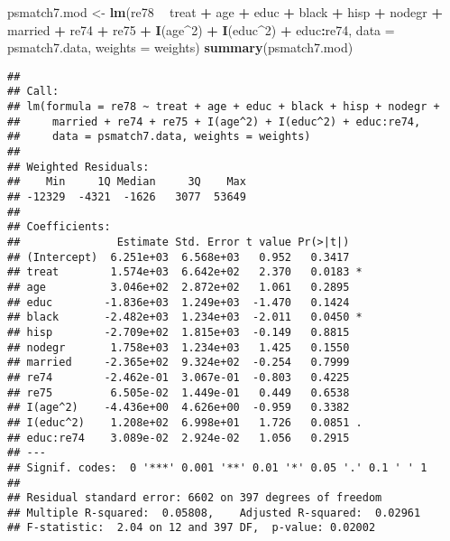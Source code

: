 \documentclass[]{article}
\newenvironment{Shaded}{\begin{snugshade}}{\end{snugshade}}
\newcommand{\DataTypeTok}[1]{\textcolor[rgb]{0.13,0.29,0.53}{#1}}
\newcommand{\DecValTok}[1]{\textcolor[rgb]{0.00,0.00,0.81}{#1}}
\newcommand{\KeywordTok}[1]{\textcolor[rgb]{0.13,0.29,0.53}{\textbf{#1}}}
\newcommand{\NormalTok}[1]{#1}
\newcommand{\OperatorTok}[1]{\textcolor[rgb]{0.81,0.36,0.00}{\textbf{#1}}}
\newcommand{\StringTok}[1]{\textcolor[rgb]{0.31,0.60,0.02}{#1}}
\begin{document}
\begin{Shaded}
\begin{Highlighting}[]
\NormalTok{psmatch7.mod <-}\StringTok{ }\KeywordTok{lm}\NormalTok{(re78 }\OperatorTok{~}\StringTok{ }\NormalTok{treat }\OperatorTok{+}\StringTok{ }\NormalTok{age }\OperatorTok{+}\StringTok{ }\NormalTok{educ }\OperatorTok{+}\StringTok{ }\NormalTok{black }\OperatorTok{+}\StringTok{ }\NormalTok{hisp }\OperatorTok{+}\StringTok{ }\NormalTok{nodegr }\OperatorTok{+}\StringTok{ }\NormalTok{married }\OperatorTok{+}\StringTok{ }\NormalTok{re74 }\OperatorTok{+}\StringTok{ }\NormalTok{re75 }\OperatorTok{+}\StringTok{ }
\StringTok{                     }\KeywordTok{I}\NormalTok{(age}\OperatorTok{^}\DecValTok{2}\NormalTok{) }\OperatorTok{+}\StringTok{ }\KeywordTok{I}\NormalTok{(educ}\OperatorTok{^}\DecValTok{2}\NormalTok{) }\OperatorTok{+}\StringTok{ }\NormalTok{educ}\OperatorTok{:}\NormalTok{re74, }
                   \DataTypeTok{data =}\NormalTok{ psmatch7.data, }\DataTypeTok{weights =}\NormalTok{ weights)}
\KeywordTok{summary}\NormalTok{(psmatch7.mod)}
\end{Highlighting}
\end{Shaded}

\begin{verbatim}
## 
## Call:
## lm(formula = re78 ~ treat + age + educ + black + hisp + nodegr + 
##     married + re74 + re75 + I(age^2) + I(educ^2) + educ:re74, 
##     data = psmatch7.data, weights = weights)
## 
## Weighted Residuals:
##    Min     1Q Median     3Q    Max 
## -12329  -4321  -1626   3077  53649 
## 
## Coefficients:
##               Estimate Std. Error t value Pr(>|t|)  
## (Intercept)  6.251e+03  6.568e+03   0.952   0.3417  
## treat        1.574e+03  6.642e+02   2.370   0.0183 *
## age          3.046e+02  2.872e+02   1.061   0.2895  
## educ        -1.836e+03  1.249e+03  -1.470   0.1424  
## black       -2.482e+03  1.234e+03  -2.011   0.0450 *
## hisp        -2.709e+02  1.815e+03  -0.149   0.8815  
## nodegr       1.758e+03  1.234e+03   1.425   0.1550  
## married     -2.365e+02  9.324e+02  -0.254   0.7999  
## re74        -2.462e-01  3.067e-01  -0.803   0.4225  
## re75         6.505e-02  1.449e-01   0.449   0.6538  
## I(age^2)    -4.436e+00  4.626e+00  -0.959   0.3382  
## I(educ^2)    1.208e+02  6.998e+01   1.726   0.0851 .
## educ:re74    3.089e-02  2.924e-02   1.056   0.2915  
## ---
## Signif. codes:  0 '***' 0.001 '**' 0.01 '*' 0.05 '.' 0.1 ' ' 1
## 
## Residual standard error: 6602 on 397 degrees of freedom
## Multiple R-squared:  0.05808,    Adjusted R-squared:  0.02961 
## F-statistic:  2.04 on 12 and 397 DF,  p-value: 0.02002
\end{verbatim}
\end{document}
